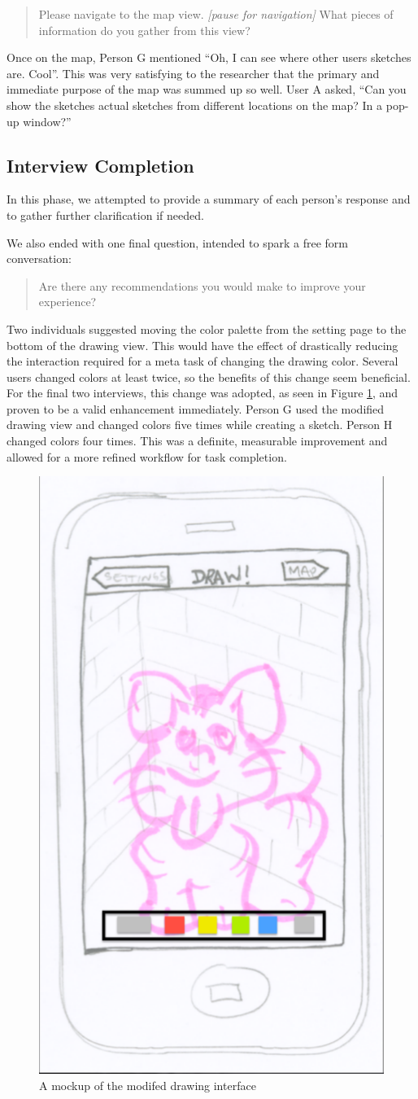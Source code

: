 \documentclass{chi2009}
\begin{document}
\begin{quote}
Please navigate to the map view. {\it [pause for navigation]}
What pieces of information do you gather from this view?
\end{quote}

Once on the map, Person G mentioned ``Oh, I can see where other users sketches
are.  Cool''.  This was very satisfying to the researcher that the primary and
immediate purpose of the map was summed up so well.  User A asked, ``Can you
show the sketches actual sketches from different locations on the map? In a
pop-up window?''


\subsection{Interview Completion}

In this phase, we attempted to provide a summary of each person's response and
to gather further clarification if needed.

We also ended with one final question, intended to spark a free form conversation:

\begin{quote}
Are there any recommendations you would make to improve your experience?
\end{quote}

Two individuals suggested moving the color palette from the setting page to the
bottom of the drawing view. This would have the effect of drastically reducing the interaction required for a meta task of changing the drawing color.  Several
users changed colors at least twice, so the benefits of this change seem
beneficial.  For the final two interviews, this change was adopted, as
seen in Figure \ref{fig:draw2}, and proven
to be a valid enhancement immediately.  Person G used the modified drawing view
and changed colors five times while creating a sketch.  Person H changed colors
four times.  This was a definite, measurable improvement and allowed for a more
refined workflow for task completion.

\begin{figure}
\centering
\includegraphics[width=.3\textwidth]{draw2.pdf}
\caption{A mockup of the modifed drawing interface}
\label{fig:draw2}
\end{figure}
\end{document}
